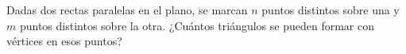 \ejercicio
Dadas dos rectas paralelas en el plano, se marcan $n$ puntos distintos sobre una y $m$ puntos distintos sobre la otra.
¿Cuántos triángulos se pueden formar con vértices en esos puntos?\\
\hacer
